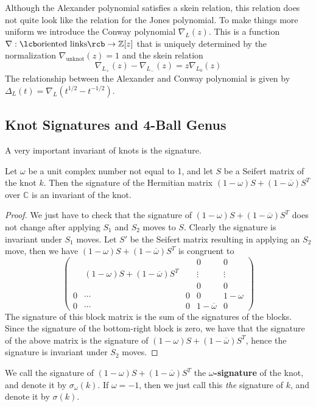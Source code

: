 Although the Alexander polynomial satisfies a skein relation, this relation does not quite look like the relation for the Jones polynomial. To make things more uniform we introduce the Conway polynomial $\nabla_L(z)$. This is a function $\nabla : \lcb \text{oriented links} \rcb \rightarrow \mathbb Z[z]$ that is uniquely determined by the normalization $\nabla_{\text{unknot}}(z) = 1$ and the skein relation
\[ \nabla_{L_+}(z) - \nabla_{L_-}(z) = z \nabla_{L_0}(z) \]
The relationship between the Alexander and Conway polynomial is given by $\Delta_L(t) = \nabla_L\left( t^{1/2}-t^{-1/2} \right)$.



\subsection{Knot Signatures and 4-Ball Genus}
\label{Knot Signatures and 4-Ball Genus}

A very important invariant of knots is the signature. 

\begin{prop}
\label{knot signature}
Let $\omega$ be a unit complex number not equal to 1, and let $S$ be a Seifert matrix of the knot $k$. Then the signature of the Hermitian matrix $(1-\omega)S + (1-\overline\omega)S^T$ over $\mathbb C$ is an invariant of the knot.
\end{prop}
\begin{proof}
We just have to check that the signature of $(1-\omega)S+(1-\overline\omega)S^T$ does not change after applying $S_1$ and $S_2$ moves to $S$. Clearly the signature is invariant under $S_1$ moves. Let $S'$ be the Seifert matrix resulting in applying an $S_2$ move, then we have $(1-\omega)S+(1-\overline\omega)S^T$ is congruent to
\[ \begin{pmatrix}  & & & 0 & 0 \\ & (1-\omega)S + (1-\overline\omega)S^T & & \vdots & \vdots \\ & & & 0 & 0 \\ 0 & \cdots & 0 & 0 & 1-\omega \\ 0 & \cdots & 0 & 1-\overline\omega & 0 \end{pmatrix} \]
The signature of this block matrix is the sum of the signatures of the blocks. Since the signature of the bottom-right block is zero, we have that the signature of the above matrix is the signature of $(1-\omega)S+(1-\overline\omega)S^T$, hence the signature is invariant under $S_2$ moves.
\end{proof}
We call the signature of $(1-\omega)S+(1-\overline\omega)S^T$ the \textbf{$\omega$-signature} of the knot, and denote it by $\sigma_\omega(k)$. If $\omega=-1$, then we just call this \emph{the} signature of $k$, and denote it by $\sigma(k)$.

